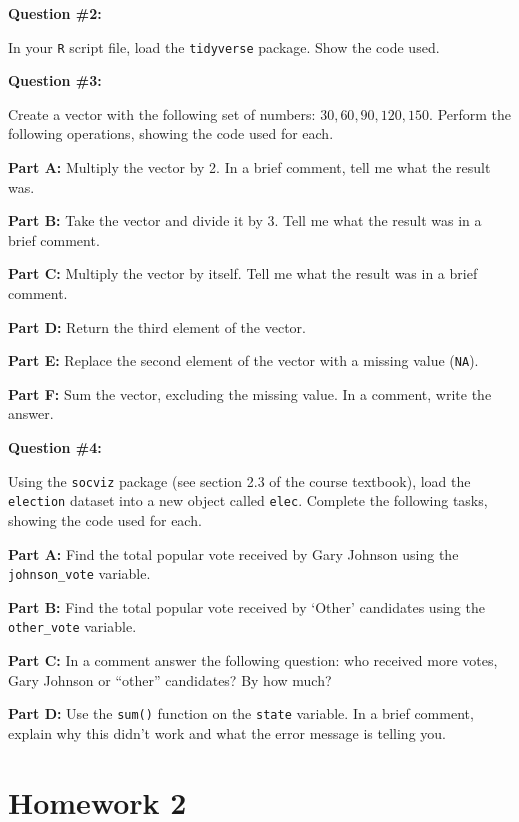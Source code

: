 \documentclass[
  letterpaper,
]{book}
\begin{document}
\textbf{Question \#2:}

In your \texttt{R} script file, load the \texttt{tidyverse} package.
Show the code used.

\textbf{Question \#3:}

Create a vector with the following set of numbers:
\({30, 60, 90, 120, 150}\). Perform the following operations, showing
the code used for each.

\textbf{Part A:} Multiply the vector by 2. In a brief comment, tell me
what the result was.

\textbf{Part B:} Take the vector and divide it by 3. Tell me what the
result was in a brief comment.

\textbf{Part C:} Multiply the vector by itself. Tell me what the result
was in a brief comment.

\textbf{Part D:} Return the third element of the vector.

\textbf{Part E:} Replace the second element of the vector with a missing
value (\texttt{NA}).

\textbf{Part F:} Sum the vector, excluding the missing value. In a
comment, write the answer.

\textbf{Question \#4:}

Using the \texttt{socviz} package (see section 2.3 of the course
textbook), load the \texttt{election} dataset into a new object called
\texttt{elec}. Complete the following tasks, showing the code used for
each.

\textbf{Part A:} Find the total popular vote received by Gary Johnson
using the \texttt{johnson\_vote} variable.

\textbf{Part B:} Find the total popular vote received by `Other'
candidates using the \texttt{other\_vote} variable.

\textbf{Part C:} In a comment answer the following question: who
received more votes, Gary Johnson or ``other'' candidates? By how much?

\textbf{Part D:} Use the \texttt{sum()} function on the \texttt{state}
variable. In a brief comment, explain why this didn't work and what the
error message is telling you.

\hypertarget{homework-2}{%
\chapter*{Homework 2}\label{homework-2}}

\end{document}
